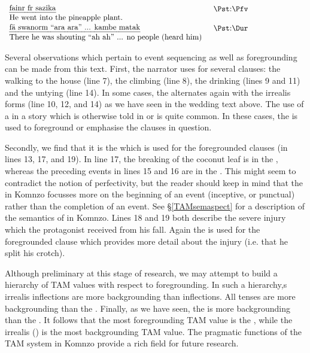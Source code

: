 \begin{exe}
	    $\begin{array}{l}
	   	\parbox{9cm}{\emph{fainr fr sazika}} \parbox{0,3cm}{\hfill}\parbox{4cm}{\Pst:\Pfv}\\
	    \parbox{9cm}{He went into the pineapple plant.} \parbox{0,3cm}{\hfill}\parbox{4cm}{\hfill}\\
	    \end{array}$
	    $\begin{array}{l}
	   	\parbox{9cm}{\emph{fä swanorm ``ara ara'' ... kambe matak}} \parbox{0,3cm}{\hfill}\parbox{4cm}{\Pst:\Dur}\\
	    \parbox{9cm}{There he was shouting ``ah ah'' ... no people (heard him)} \parbox{0,3cm}{\hfill}\parbox{4cm}{\hfill}\\
	    \end{array}$
	\\
	\label{masentext}
\end{exe}

Several observations which pertain to event sequencing as well as foregrounding can be made from this text. First, the narrator uses   for several clauses: the walking to the house (line 7), the climbing (line 8), the drinking (lines 9 and 11) and the untying (line 14). In some cases, the  alternates again with the irrealis  forms (line 10, 12, and 14) as we have seen in the wedding text above. The use of a   in a story which is otherwise told in  or  is quite common. In these cases, the  is used to foreground or emphasise the clauses in question.

Secondly, we find that it is the   which is used for the foregrounded clauses (in lines 13, 17, and 19). In line 17, the breaking of the coconut leaf is in the , whereas the preceding events in lines 15 and 16 are in the . This might seem to contradict the notion of perfectivity, but the reader should keep in mind that the  in Komnzo focusses more on the beginning of an event (inceptive, or punctual) rather than the completion of an event. See {\S}\ref{TAMsemaspect} for a description of the semantics of  in Komnzo. Lines 18 and 19 both describe the severe injury which the protagonist received from his fall. Again the   is used for the foregrounded clause which provides more detail about the injury (i.e. that he split his crotch).

Although preliminary at this stage of research, we may attempt to build a hierarchy of TAM values with respect to foregrounding. In such a hierarchy,s irrealis inflections are more backgrounding than  inflections. All  tenses are more backgrounding than the . Finally, as we have seen, the  is more backgrounding than the . It follows that the most foregrounding TAM value is the , while the irrealis () is the most backgrounding TAM value. The pragmatic functions of the TAM system in Komnzo provide a rich field for future research.